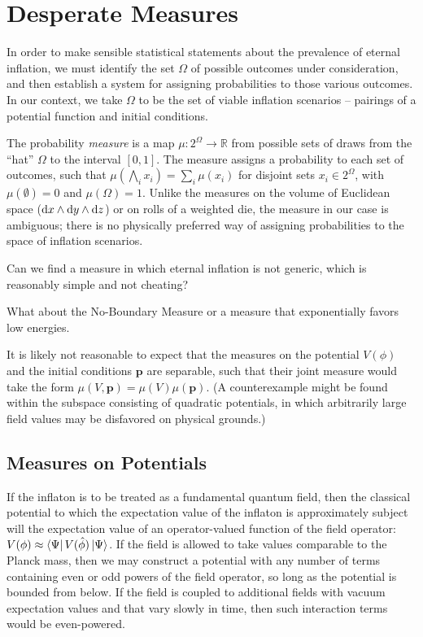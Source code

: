 \section{Desperate Measures}

In order to make sensible statistical statements about the prevalence of eternal inflation, we must identify the set $\Omega$ of possible outcomes under consideration, and then establish a system for assigning probabilities to those various outcomes.  
In our context, we take $\Omega$ to be the set of viable inflation scenarios -- pairings of a potential function and initial conditions.  

The probability {\it measure} is a map $\mu : 2^\Omega \to \mathbb R$ from possible sets of draws from the ``hat'' $\Omega$ to the interval $[0,1]$.  The measure assigns a probability to each set of outcomes, such that $\mu(\bigwedge_i x_i) = \sum_i \mu(x_i)$ for disjoint sets $x_i \in 2^\Omega$,
with $\mu(\emptyset)=0$ and $\mu(\Omega) = 1$.
Unlike the measures on the volume of Euclidean space ($\mathrm d x \wedge \mathrm d y \wedge \mathrm d z$) or on rolls of a weighted die, the measure in our case is ambiguous; there is no physically preferred way of assigning probabilities to the space of inflation scenarios.

Can we find a measure in which eternal inflation is not generic, which is reasonably simple and not cheating?

What about the No-Boundary Measure or a measure that exponentially favors low energies.

It is likely not reasonable to expect that the measures on the potential $V(\phi)$ and the initial conditions $\mathbf p$ are separable, such that their joint measure would take the form $\mu(V,\mathbf p) = \mu(V) \mu(\mathbf p)$.  (A counterexample might be found within the subspace consisting of quadratic potentials, in which arbitrarily large field values may be disfavored on physical grounds.)





\subsection{Measures on Potentials}

If the inflaton is to be treated as a fundamental quantum field, then the classical potential to which the expectation value of the inflaton is approximately subject will the expectation value of an operator-valued function of the field operator: $V(\phi) \approx \left\langle \Psi \right\rvert V(\hat \phi) \left\lvert \Psi \right\rangle$.  If the field is allowed to take values comparable to the Planck mass, then we may construct a potential with any number of terms containing even or odd powers of the field operator, so long as the potential is bounded from below.  
If the field is coupled to additional fields with vacuum expectation values and that vary slowly in time, then such interaction terms would be even-powered.


